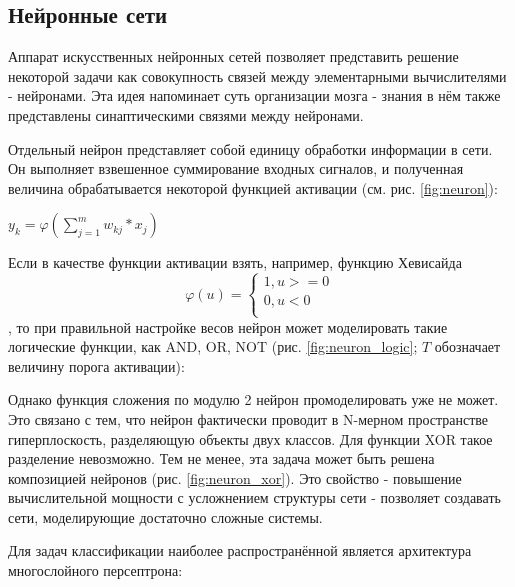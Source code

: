 
\subsection{Нейронные сети}


Аппарат искусственных нейронных сетей позволяет представить решение некоторой задачи как совокупность связей между элементарными вычислителями - нейронами. Эта идея напоминает суть организации мозга - знания в нём также представлены синаптическими связями между нейронами. 

Отдельный нейрон представляет собой единицу обработки информации в сети. Он выполняет взвешенное суммирование входных сигналов, и полученная величина обрабатывается некоторой функцией активации (см. рис. \ref{fig:neuron})\cite{haykin_nn}: 

$y_k=\varphi(\sum\limits_{j=1}^m w_{kj}*x_j)$



Если в качестве функции активации взять, например, функцию Хевисайда 
\[
  \varphi(u)=\begin{cases}
               1, u>=0\\
               0, u<0 \\
              \end{cases}
\], то при правильной настройке весов нейрон может моделировать такие логические функции, как AND, OR, NOT (рис. \ref{fig:neuron_logic}\cite{neuron_logic}; $T$ обозначает величину порога активации):


Однако функция сложения по модулю 2 нейрон промоделировать уже не может. Это связано с тем, что нейрон фактически проводит в N-мерном пространстве гиперплоскость, разделяющую объекты двух классов. Для функции XOR такое разделение невозможно. Тем не менее, эта задача может быть решена композицией нейронов (рис. \ref{fig:neuron_xor}). Это свойство - повышение вычислительной мощности с усложнением структуры сети - позволяет создавать сети, моделирующие достаточно сложные системы. 



Для задач классификации наиболее распространённой является архитектура многослойного персептрона\cite{haykin_nn}:

